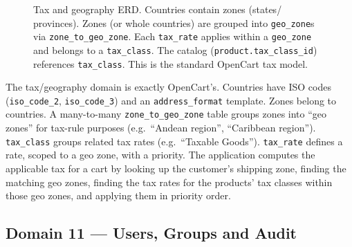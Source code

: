 \documentclass[11pt,a4paper]{article}
\begin{document}
\begin{figure}[htbp]
\centering
{}
\caption{Tax and geography ERD. Countries contain zones (states/
provinces). Zones (or whole countries) are grouped into
\texttt{geo\_zone}s via \texttt{zone\_to\_geo\_zone}. Each
\texttt{tax\_rate} applies within a \texttt{geo\_zone} and
belongs to a \texttt{tax\_class}. The catalog
(\texttt{product.tax\_class\_id}) references
\texttt{tax\_class}. This is the standard OpenCart tax model.}
\label{fig:tax}
\end{figure}

The tax/geography domain is exactly OpenCart's. Countries have
ISO codes (\texttt{iso\_code\_2}, \texttt{iso\_code\_3}) and
an \texttt{address\_format} template. Zones belong to countries.
A many-to-many \texttt{zone\_to\_geo\_zone} table groups zones
into ``geo zones'' for tax-rule purposes (e.g.\ ``Andean
region'', ``Caribbean region''). \texttt{tax\_class} groups
related tax rates (e.g.\ ``Taxable Goods''). \texttt{tax\_rate}
defines a rate, scoped to a geo zone, with a priority. The
application computes the applicable tax for a cart by looking
up the customer's shipping zone, finding the matching geo
zones, finding the tax rates for the products' tax classes
within those geo zones, and applying them in priority order.

\subsection{Domain 11 --- Users, Groups and Audit}\label{sec:users}
\end{document}
